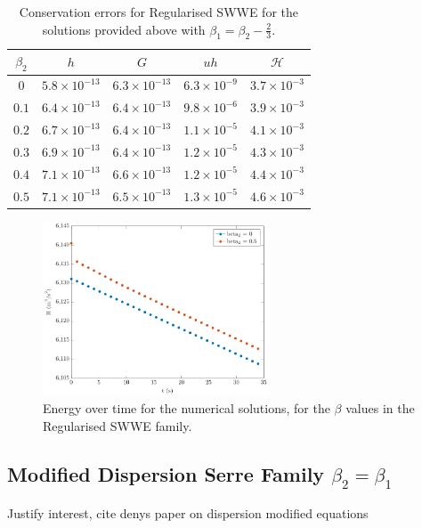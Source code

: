 \documentclass[10pt]{article}
\newcommand\T{\rule{0pt}{5ex }}       %
\begin{document}
\begin{table}
	\centering
	\begin{tabular}{ c | c | c | c | c }
	$\beta_2$ & $h$ & $G$ & $uh$ & $\mathcal{H}$  \\
		\hline
	\T $0$ &	$5.8 \times 10^{-13}$ & $6.3 \times 10^{-13}$  & $6.3 \times 10^{-9}$ &	 $3.7 \times 10^{-3}$ \\
	\T $0.1$ &	$6.4 \times 10^{-13}$ & $6.4 \times 10^{-13}$  & $9.8 \times 10^{-6}$ &	 $3.9 \times 10^{-3}$ \\
	\T $0.2$ &	$6.7 \times 10^{-13}$ & $6.4 \times 10^{-13}$  & $1.1\times 10^{-5}$ &	 $4.1 \times 10^{-3}$ \\
	\T $0.3$ &	$6.9 \times 10^{-13}$ & $6.4 \times 10^{-13}$  & $1.2\times 10^{-5}$ &	 $4.3 \times 10^{-3}$ \\
	\T $0.4$ &	$7.1 \times 10^{-13}$ & $6.6 \times 10^{-13}$  & $1.2\times 10^{-5}$ &	 $4.4 \times 10^{-3}$ \\
	\T $0.5$ &	$7.1 \times 10^{-13}$ & $6.5 \times 10^{-13}$  & $1.3\times 10^{-5}$ &	 $4.6 \times 10^{-3}$ \\
	\end{tabular}
	\caption{Conservation errors for Regularised SWWE for the solutions provided above with $\beta_1 = \beta_2 - \frac{2}{3}$.}
\end{table}


\begin{figure}
	\centering
	\includegraphics[width=0.6\textwidth]{./Figures/Simulations/Study/RegSWWE/Energy/EnergyOverTime.pdf}
	\caption{Energy over time for the numerical solutions, for the $\beta$ values in the Regularised SWWE family.}
\end{figure}


\subsection{Modified Dispersion Serre Family $\beta_2 = \beta_1$}
Justify interest, cite denys paper on dispersion modified equations
\end{document}
